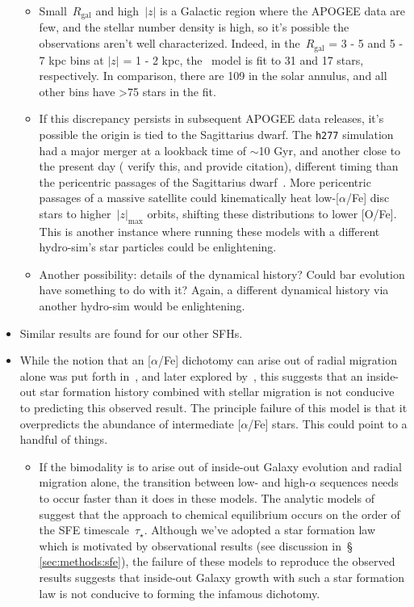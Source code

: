 \documentclass[fleqn, usenatbib]{mnras}
\begin{document}
\begin{itemize}
\begin{itemize}
		\item Small~$R_\text{gal}$ and high~$\left|z\right|$ is a Galactic 
		region where the APOGEE data are few, and the stellar number density is 
		high, so it's possible the observations aren't well characterized. 
		Indeed, in the~$R_\text{gal}$ = 3 - 5 and 5 - 7 kpc bins at 
		$\left|z\right|$ = 1 - 2 kpc, the~\citet{Vincenzo2021} model 
		is fit to 31 and 17 stars, respectively. In comparison, there are 109 
		in the solar annulus, and all other bins have >75 stars in the fit. 

		\item If this discrepancy persists in subsequent APOGEE data releases, 
		it's possible the origin is tied to the Sagittarius dwarf. The 
		\texttt{h277} simulation had a major merger at a lookback time of 
		$\sim$10 Gyr, and another close to the present day ({\color{red} verify 
		this, and provide citation}), different timing than the pericentric 
		passages of the Sagittarius dwarf~\citep{RuizLara2020}. More 
		pericentric passages of a massive satellite could kinematically 
		heat low-[$\alpha$/Fe] disc stars to higher~$\left|z\right|_\text{max}$ 
		orbits, shifting these distributions to lower [O/Fe]. {\color{red} This 
		is another instance where running these models with a different 
		hydro-sim's star particles could be enlightening. } 

		\item Another possibility: details of the dynamical history? Could 
		bar evolution have something to do with it? Again, a different 
		dynamical history via another hydro-sim would be enlightening. 
	\end{itemize} 

	\item Similar results are found for our other SFHs. 

	\item While the notion that an [$\alpha$/Fe] dichotomy can arise out of 
	radial migration alone was put forth in~\citet{Schoenrich2009}, and later 
	explored by~\citet{Nidever2014}, this suggests that an inside-out star 
	formation history combined with stellar migration is not conducive to 
	predicting this observed result. The principle failure of this model is 
	that it overpredicts the abundance of intermediate [$\alpha$/Fe] stars. 
	This could point to a handful of things. 
	\begin{itemize} 
		\item If the bimodality is to arise out of inside-out Galaxy evolution 
		and radial migration alone, the transition between low- and 
		high-$\alpha$ sequences needs to occur faster than it does in these 
		models. The analytic models of~\citet{Weinberg2017} suggest that the 
		approach to chemical equilibrium occurs on the order of the SFE 
		timescale~$\tau_\star$. Although we've adopted a star formation law 
		which is motivated by observational results (see discussion in~\S 
		\ref{sec:methods:sfe}), the failure of these models to reproduce the 
		observed results suggests that inside-out Galaxy growth with such a 
		star formation law is not conducive to forming the infamous 
		dichotomy. 


\end{itemize}
\end{itemize}
\end{document}
